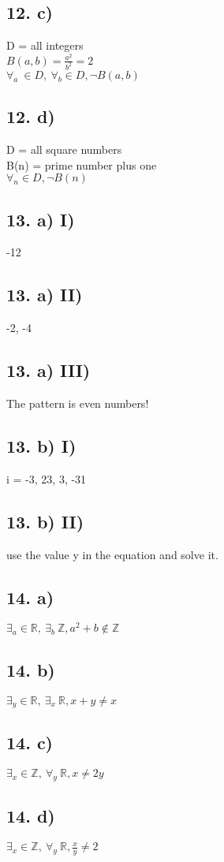 \documentclass[12]{scrartcl}
\begin{document}
\subsection*{12. c)}
D = all integers\\
$B(a, b) = \frac{a^2}{b^2} = 2$\\
$\forall_a \ \in D,\ \forall_b \in D, \neg B(a, b)$

\subsection*{12. d)}
D = all square numbers\\
B(n) = prime number plus one\\
$\forall_n \in D, \neg B(n)$

\subsection*{13. a) I)}
-12
\subsection*{13. a) II)}
-2, -4 
\subsection*{13. a) III)}
The pattern is even numbers!

\subsection*{13. b) I)}
i = -3, 23, 3, -31
\subsection*{13. b) II)}
use the value y in the equation and solve it. 

\subsection*{14. a) }

$\exists_a \in \mathds{R}, \ \exists_b \ \mathds{Z}, a^2 + b \notin \mathds{Z} $

\subsection*{14. b) }
$\exists_y \in \mathds{R}, \ \exists_x \ \mathds{R}, x + y \neq x$

\subsection*{14. c) }
$\exists_x \in \mathds{Z}, \ \forall_y \ \mathds{R}, x \neq 2y$

\subsection*{14. d) }
$\exists_x \in \mathds{Z}, \ \forall_y \ \mathds{R}, \frac{x}{y} \neq 2$
\end{document}
